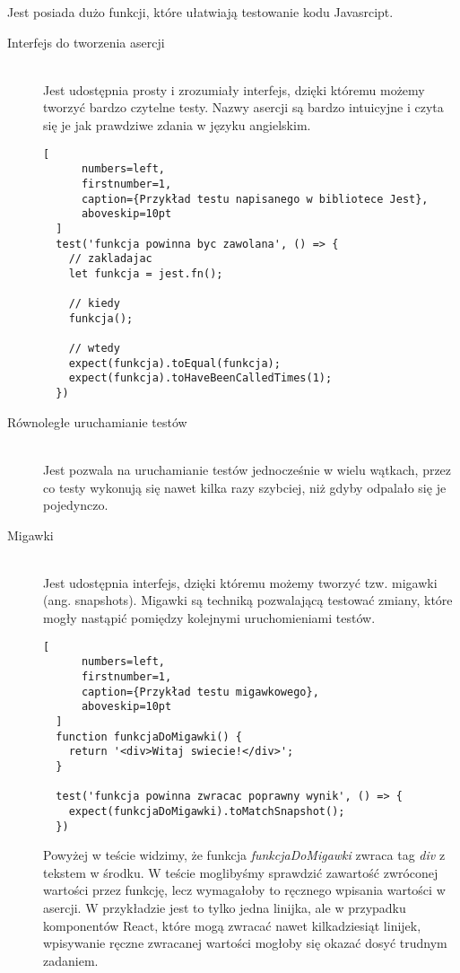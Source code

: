 Jest posiada dużo funkcji, które ułatwiają testowanie kodu Javasrcipt.
\begin{description}
  \item[Interfejs do tworzenia asercji] \hfill \\ Jest udostępnia prosty i zrozumiały interfejs, dzięki któremu możemy tworzyć bardzo czytelne testy. Nazwy asercji są bardzo intuicyjne i czyta się je jak prawdziwe zdania w języku angielskim.
  \begin{addmargin}[6mm]{0mm}
  \begin{lstlisting}[
      numbers=left,
      firstnumber=1,
      caption={Przykład testu napisanego w bibliotece Jest},
      aboveskip=10pt
  ]
  test('funkcja powinna byc zawolana', () => {
    // zakladajac
    let funkcja = jest.fn();

    // kiedy
    funkcja();

    // wtedy
    expect(funkcja).toEqual(funkcja);
    expect(funkcja).toHaveBeenCalledTimes(1);
  })
  \end{lstlisting}
  \end{addmargin}

  \item[Równoległe uruchamianie testów] \hfill \\ Jest pozwala na uruchamianie testów jednocześnie w wielu wątkach, przez co testy wykonują się nawet kilka razy szybciej, niż gdyby odpalało się je pojedynczo.
  \item[Migawki] \hfill \\ Jest udostępnia interfejs, dzięki któremu możemy tworzyć tzw. migawki (ang. snapshots). Migawki są techniką pozwalającą testować zmiany, które mogły nastąpić pomiędzy kolejnymi uruchomieniami testów.
  \begin{addmargin}[6mm]{0mm}
  \begin{lstlisting}[
      numbers=left,
      firstnumber=1,
      caption={Przykład testu migawkowego},
      aboveskip=10pt
  ]
  function funkcjaDoMigawki() {
    return '<div>Witaj swiecie!</div>';
  }

  test('funkcja powinna zwracac poprawny wynik', () => {
    expect(funkcjaDoMigawki).toMatchSnapshot();
  })
  \end{lstlisting}
  \end{addmargin}
  Powyżej w teście widzimy, że funkcja \emph{funkcjaDoMigawki} zwraca tag \emph{div} z tekstem w środku. W teście moglibyśmy sprawdzić zawartość zwróconej wartości przez funkcję, lecz wymagałoby to ręcznego wpisania wartości w asercji. W przykładzie jest to tylko jedna linijka, ale w przypadku komponentów React, które mogą zwracać nawet kilkadziesiąt linijek, wpisywanie ręczne zwracanej wartości mogłoby się okazać dosyć trudnym zadaniem.


\end{description}
